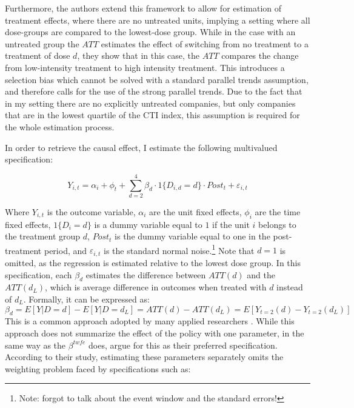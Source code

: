 \documentclass[12pt]{article}
\begin{document}
Furthermore, the authors extend this framework to allow for estimation of treatment effects, where there are no untreated units, implying a setting where all dose-groups are compared to the lowest-dose group. While in the case with an untreated group the $ATT$ estimates the effect of switching from no treatment to a treatment of dose $d$, they show that in this case, the $ATT$ compares the change from low-intensity treatment to high intensity treatment. This introduces a selection bias which cannot be solved with a standard parallel trends assumption, and therefore calls for the use of the strong parallel trends. Due to the fact that in my setting there are no explicitly untreated companies, but only companies that are in the lowest quartile of the CTI index, this assumption is required for the whole estimation process.

In order to retrieve the causal effect, I estimate the following multivalued specification:

\begin{equation}
    Y_{i,t} = \alpha_i + \phi_t + \sum_{d=2}^{4} \beta_d \cdot 1\{D_{i,d}=d\}\cdot Post_t + \varepsilon_{i,t}
\end{equation}

Where $Y_{i,t}$ is the outcome variable, $\alpha_i$ are the unit fixed effects, $\phi_i$ are the time fixed effects, $1\{D_{i}=d\}$ is a dummy variable equal to $1$ if the unit $i$ belongs to the treatment group $d$, $Post_t$ is the dummy variable equal to one in the post-treatment period, and $\varepsilon_{i,t}$ is the standard normal noise.\footnote{Note: forgot to talk about the event window and the standard errors!} Note that $d=1$ is omitted, as the regression is estimated relative to the lowest dose group. In this specification, each $\beta_d$ estimates the difference between $ATT(d)$ and the $ATT(d_L)$, which is average difference in outcomes when treated with $d$ instead of $d_L$. Formally, it can be expressed as: 
\begin{equation}
    \beta_d = E[Y|D = d] - E[Y |D = d_L] = ATT(d) - ATT(d_L) = E[Y_{t=2}(d) - Y_{t=2}(d_L)]
\end{equation}
This is a common approach adopted by many applied researchers \parencite{acemoglu_finkelstein_medicare,deschenes_greenstone_clim_change}. While this approach does not summarize the effect of the policy with one parameter, in the same way as the $\beta^{twfe}$ does, \citeauthor{callawayDifferenceindifferencesContinuousTreatment2024} argue for this as their preferred specification. According to their study, estimating these parameters separately omits the weighting problem faced by specifications such as:
\end{document}
